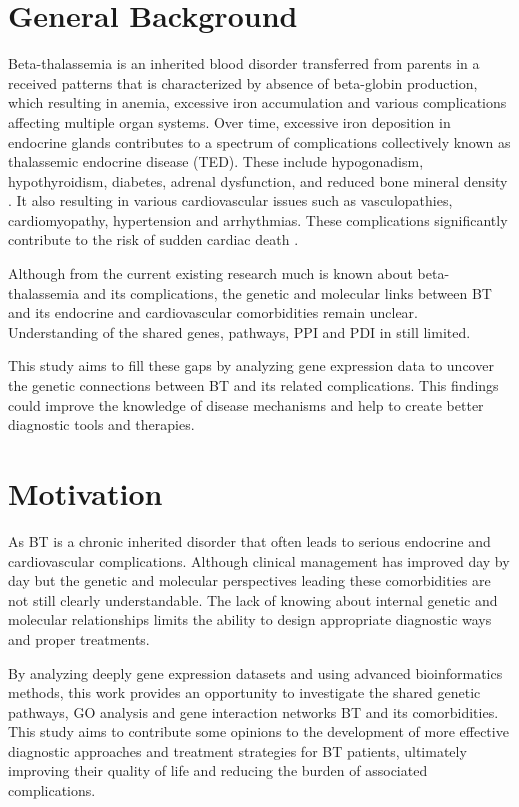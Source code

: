 \section{General Background}
\label{sec:sec1_2}
Beta-thalassemia is an inherited blood disorder transferred from parents in a received patterns that is characterized by absence of beta-globin production, which resulting in anemia, excessive iron accumulation and various complications affecting multiple organ systems. Over time, excessive iron deposition in endocrine glands contributes to a spectrum of complications collectively known as thalassemic endocrine disease (TED). These include hypogonadism, hypothyroidism, diabetes, adrenal dysfunction, and reduced bone mineral density \cite{b7}. It also resulting in various cardiovascular issues such as vasculopathies, cardiomyopathy, hypertension and arrhythmias. These complications significantly contribute to the risk of sudden cardiac death \cite{b8}. 

Although from the current existing research much is known about beta-thalassemia and its complications, the genetic and molecular links between BT and its endocrine and cardiovascular comorbidities remain unclear. Understanding of the shared genes, pathways, PPI and PDI in still limited. 

This study aims to fill these gaps by analyzing gene expression data to uncover the genetic connections between BT and its related complications. This findings could improve the knowledge of disease mechanisms and help to create better diagnostic tools and therapies.
 
\section{Motivation}
\label{sec:sec1_3}
As BT is a chronic inherited disorder that often leads to serious endocrine and cardiovascular complications. Although clinical management has improved day by day but the genetic and molecular perspectives leading these comorbidities are not still clearly understandable. The lack of knowing about internal genetic and molecular relationships limits the ability to design appropriate diagnostic ways and proper treatments.

By analyzing deeply gene expression datasets and using advanced bioinformatics methods, this work provides an opportunity to investigate the shared genetic pathways, GO analysis and gene interaction networks BT and its comorbidities. This study aims to contribute some opinions to the development of more effective diagnostic approaches and treatment strategies for BT patients, ultimately improving their quality of life and reducing the burden of associated complications.

